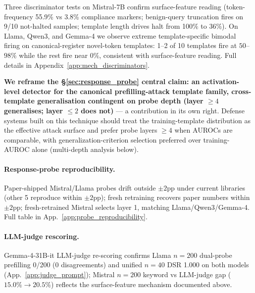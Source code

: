\documentclass{article}
\begin{document}
Three discriminator tests on Mistral-7B confirm surface-feature reading (token-frequency 55.9\% vs 3.8\% compliance markers; benign-query truncation fires on 9/10 not-halted samples; template length drives halt from 100\% to 36\%). On Llama, Qwen3, and Gemma-4 we observe extreme template-specific bimodal firing on canonical-register novel-token templates: 1--2 of 10 templates fire at $50$--$98\%$ while the rest fire near $0\%$, consistent with surface-feature reading. Full details in Appendix~\ref{app:mech_discriminators}.

\textbf{We reframe the \S\ref{sec:response_probe} central claim: an activation-level detector for the canonical prefilling-attack template family, cross-template generalisation contingent on probe depth (layer $\geq 4$ generalises; layer $\leq 2$ does not)} --- a contribution in its own right. Defense systems built on this technique should treat the training-template distribution as the effective attack surface and prefer probe layers $\geq 4$ when AUROCs are comparable, with generalization-criterion selection preferred over training-AUROC alone (multi-depth analysis below).

\paragraph{Response-probe reproducibility.} Paper-shipped Mistral/Llama probes drift outside $\pm 2$pp under current libraries (other 5 reproduce within $\pm 2$pp); fresh retraining recovers paper numbers within $\pm 2$pp; fresh-retrained Mistral selects layer 1, matching Llama/Qwen3/Gemma-4. Full table in App.~\ref{app:probe_reproducibility}.

\paragraph{LLM-judge rescoring.}
Gemma-4-31B-it LLM-judge re-scoring confirms Llama $n=200$ dual-probe prefilling 0/200 (0 disagreements) and unified $n=40$ DSR 1.000 on both models (App.~\ref{app:judge_prompt}); Mistral $n=200$ keyword vs LLM-judge gap ($15.0\%\to 20.5\%$) reflects the surface-feature mechanism documented above.
\end{document}
